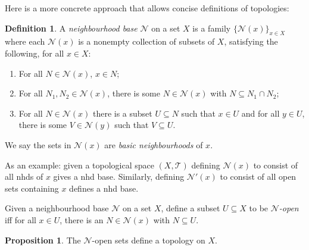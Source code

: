 \documentclass{tufte-handout}
\def\cT {\mathcal{T}}
\def\cN {\mathcal{N}}
\theoremstyle{definition}
\newtheorem{prop}{Proposition}
\newtheorem{definition}{Definition}
\begin{document}
Here is a more concrete approach that allows concise definitions of topologies:

\begin{definition} 
	A \emph{neighbourhood base} $\cN$ on a set $X$ is a family 
	$\{\cN(x)\}_{x\in X}$ where each $\cN(x)$ is a nonempty collection of subsets of $X$, 
	satisfying the following, for all $x\in X$: 

	\begin{enumerate} 

	\item For all $N\in \cN(x)$, $x\in N$;
 
	\item For all $N_1,N_2 \in \cN(x)$, there is some $N\in \cN(x)$ with $N\subseteq N_1 
	\cap N_2$;

	\item For all $N\in \cN(x)$ there is a subset $U\subseteq N$ such that $x\in U$ and for 
	all $y\in U$, there is some $V \in \cN(y)$ such that $V\subseteq U$. 

	\end{enumerate} 

	We say the sets in $\cN(x)$ are \emph{basic neighbourhoods} of $x$. 
\end{definition}

As an example: given a topological space $(X,\cT)$ defining $\cN(x)$ to consist of all nhds 
of $x$ gives a nhd base. Similarly, defining $\cN'(x)$ to consist of all open sets 
containing $x$ defines a nhd base.


Given a neighbourhood base $\cN$ on a set $X$, define a subset $U\subseteq X$ to be 
\emph{$\cN$-open} iff for all $x\in U$, there is an $N\in \cN(x)$ with $N\subseteq U$.

\begin{prop} 
The $\cN$-open sets define a topology on $X$. 
\end{prop} 
\end{document}
